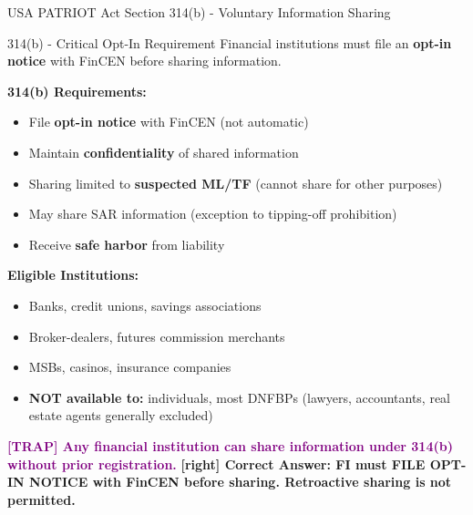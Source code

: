 \documentclass[11pt,a4paper]{beamer}
\newcommand{\trap}[1]{\textcolor{purple}{\textbf{[TRAP] #1}}}
\newcommand{\correct}[1]{\textcolor{green!50!black}{\textbf{[right] #1}}}
\begin{document}
\begin{frame}{USA PATRIOT Act Section 314(b) - Voluntary Information Sharing}
\begin{block}{314(b) - Critical Opt-In Requirement}
Financial institutions must file an \textbf{opt-in notice} with FinCEN before sharing information.
\end{block}
\textbf{314(b) Requirements:}
\begin{itemize}
\item File \textbf{opt-in notice} with FinCEN (not automatic)
\item Maintain \textbf{confidentiality} of shared information
\item Sharing limited to \textbf{suspected ML/TF} (cannot share for other purposes)
\item May share SAR information (exception to tipping-off prohibition)
\item Receive \textbf{safe harbor} from liability
\end{itemize}
\textbf{Eligible Institutions:}
\begin{itemize}
\item Banks, credit unions, savings associations
\item Broker-dealers, futures commission merchants
\item MSBs, casinos, insurance companies
\item \textbf{NOT available to:} individuals, most DNFBPs (lawyers, accountants, real estate agents generally excluded)
\end{itemize}
\trap{Any financial institution can share information under 314(b) without prior registration.}
\correct{Correct Answer: FI must FILE OPT-IN NOTICE with FinCEN before sharing. Retroactive sharing is not permitted.}
\end{frame}

\end{document}
